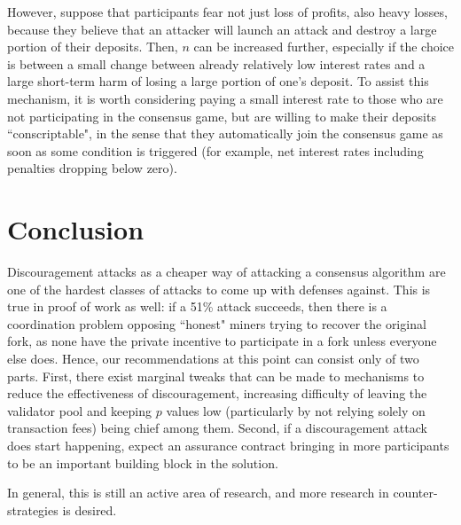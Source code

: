 \documentclass[12pt]{article}
\begin{document}
However, suppose that participants fear not just loss of profits, also heavy losses, because they believe that an attacker will launch an attack and destroy a large portion of their deposits. Then, $n$ can be increased further, especially if the choice is between a small change between already relatively low interest rates and a large short-term harm of losing a large portion of one's deposit. To assist this mechanism, it is worth considering paying a small interest rate to those who are not participating in the consensus game, but are willing to make their deposits ``conscriptable", in the sense that they automatically join the consensus game as soon as some condition is triggered (for example, net interest rates including penalties dropping below zero).


\section{Conclusion}

Discouragement attacks as a cheaper way of attacking a consensus algorithm are one of the hardest classes of attacks to come up with defenses against. This is true in proof of work as well: if a 51\% attack succeeds, then there is a coordination problem opposing ``honest" miners trying to recover the original fork, as none have the private incentive to participate in a fork unless everyone else does. Hence, our recommendations at this point can consist only of two parts. First, there exist marginal tweaks that can be made to mechanisms to reduce the effectiveness of discouragement, increasing difficulty of leaving the validator pool and keeping $p$ values low (particularly by not relying solely on transaction fees) being chief among them. Second, if a discouragement attack does start happening, expect an assurance contract bringing in more participants to be an important building block in the solution.

In general, this is still an active area of research, and more research in counter-strategies is desired.



\end{document}
